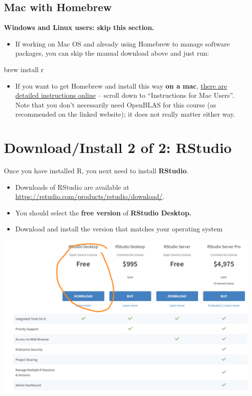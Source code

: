 \documentclass[
  letterpaper,
  DIV=11,
  numbers=noendperiod]{scrreprt}
\newenvironment{Shaded}{\begin{snugshade}}{\end{snugshade}}
\newcommand{\NormalTok}[1]{\textcolor[rgb]{0.00,0.23,0.31}{#1}}
\providecommand{\tightlist}{%
  \setlength{\itemsep}{0pt}\setlength{\parskip}{0pt}}\usepackage{longtable,booktabs,array}
\theoremstyle{remark}
\begin{document}
\subsection{Mac with Homebrew}\label{mac-with-homebrew}

\textbf{Windows and Linux users: skip this section.}

\begin{itemize}
\tightlist
\item
  If working on Mac OS and already using Homebrew to manage software
  packages, you can skip the manual download above and just run:
\end{itemize}

\begin{Shaded}
\begin{Highlighting}[]
\NormalTok{brew install r}
\end{Highlighting}
\end{Shaded}

\begin{itemize}
\tightlist
\item
  If you want to get Homebrew and install this way \textbf{on a mac},
  \href{https://www.r-bloggers.com/how-to-install-r-on-mac-ubuntu-and-windows/}{there
  are detailed instructions online} -- scroll down to ``Instructions for
  Mac Users''. Note that you don't necessarily need OpenBLAS for this
  course (as recommended on the linked website); it does not really
  matter either way.
\end{itemize}

\section{Download/Install 2 of 2:
RStudio}\label{downloadinstall-2-of-2-rstudio}

Once you have installed R, you next need to install \textbf{RStudio}.

\begin{itemize}
\tightlist
\item
  Downloads of RStudio are available at
  \url{https://rstudio.com/products/rstudio/download/}.
\item
  You should select the \textbf{free version} of \textbf{RStudio
  Desktop.}
\item
  Download and install the version that matches your operating system
\end{itemize}

\includegraphics[width=0.85\linewidth,height=\textheight,keepaspectratio]{images/rstudio.png}
\end{document}
